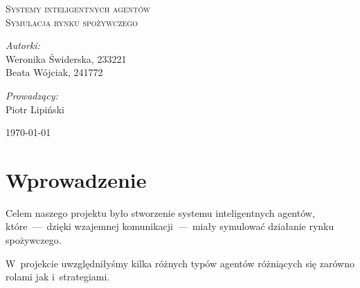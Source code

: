\documentclass[12pt]{article}
\begin{document}
\begin{titlepage}
\vspace*{\fill}
 \begin{center}

  \textsc{\LARGE Systemy inteligentnych agentów}\\[2.0cm]
  \textsc{\Large Symulacja rynku spożywczego}\\[1.5cm] 

\vspace*{\fill}
  \begin{minipage}{0.4\textwidth}
    \begin{flushleft} \large
    \emph{Autorki:}\\
    Weronika Świderska, 233221 \\ Beata Wójciak, 241772
    \end{flushleft}
    \end{minipage}
    \begin{minipage}{0.4\textwidth}
    \begin{flushright} \large
    \emph{Prowadzący:} \\
    Piotr Lipiński
    \end{flushright}
  \end{minipage}

\vspace*{\fill}
{\large \today}
 \end{center}

\end{titlepage}
\newpage
\tableofcontents
\newpage

\section{Wprowadzenie}
Celem naszego projektu było stworzenie systemu inteligentnych agentów, które~---~dzięki wzajemnej komunikacji~---~miały symulować działanie rynku spożywczego.

W~projekcie uwzględniłyśmy kilka różnych typów agentów różniących się zarówno rolami jak i~strategiami.
\end{document}
